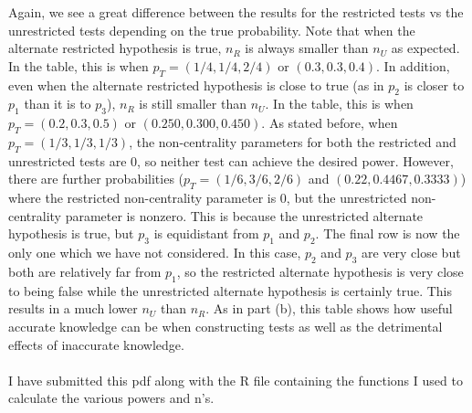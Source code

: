\documentclass{article}
\begin{document}
Again, we see a great difference between the results for the restricted tests vs the unrestricted tests depending on the true probability. Note that when the alternate restricted hypothesis is true, $n_R$ is always smaller than $n_U$ as expected. In the table, this is when $p_T = (1/4, 1/4, 2/4)$ or $(0.3, 0.3, 0.4)$. In addition, even when the alternate restricted hypothesis is close to true (as in $p_2$ is closer to $p_1$ than it is to $p_3$), $n_R$ is still smaller than $n_U$. In the table, this is when $p_T = (0.2, 0.3, 0.5)$ or $(0.250, 0.300, 0.450)$. As stated before, when $p_T = (1/3, 1/3, 1/3)$, the non-centrality parameters for both the restricted and unrestricted tests are 0, so neither test can achieve the desired power. However, there are further probabilities ($p_T = (1/6, 3/6, 2/6)$ and $(0.22, 0.4467, 0.3333)$) where the restricted non-centrality parameter is 0, but the unrestricted non-centrality parameter is nonzero. This is because the unrestricted alternate hypothesis is true, but $p_3$ is equidistant from $p_1$ and $p_2$. The final row is now the only one which we have not considered. In this case, $p_2$ and $p_3$ are very close but both are relatively far from $p_1$, so the restricted alternate hypothesis is very close to being false while the unrestricted alternate hypothesis is certainly true. This results in a much lower $n_U$ than $n_R$. As in part (b), this table shows how useful accurate knowledge can be when constructing tests as well as the detrimental effects of inaccurate knowledge.\\\\

I have submitted this pdf along with the R file containing the functions I used to calculate the various powers and n's.
\end{document}
